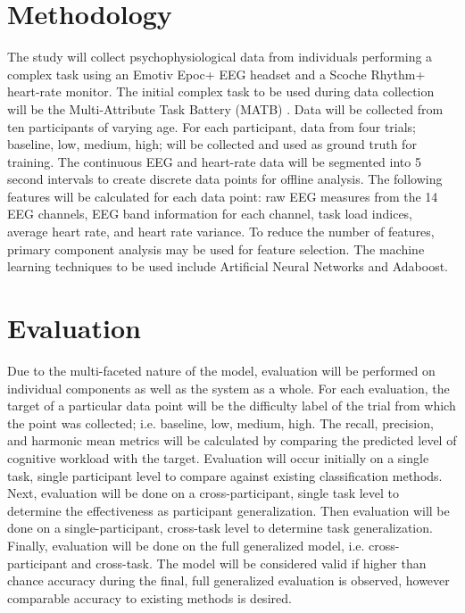 \documentclass[11pt]{artikel3}
\begin{document}
\section{Methodology}

The study will collect psychophysiological data from individuals performing a complex task using an Emotiv Epoc+ EEG headset and a Scoche Rhythm+ heart-rate monitor. The initial complex task to be used during data collection will be the Multi-Attribute Task Battery (MATB) \cite{miller_updated_2014}. Data will be collected from ten participants of varying age. For each participant, data from four trials; baseline, low, medium, high; will be collected and used as ground truth for training. The continuous EEG and heart-rate data will be segmented into 5 second intervals to create discrete data points for offline analysis. The following features will be calculated for each data point: raw EEG measures from the 14 EEG channels, EEG band information for each channel, task load indices, average heart rate, and heart rate variance. To reduce the number of features, primary component analysis may be used for feature selection. The machine learning techniques to be used include Artificial Neural Networks and Adaboost.

\section{Evaluation}

Due to the multi-faceted nature of the model, evaluation will be performed on individual components as well as the system as a whole. For each evaluation, the target of a particular data point will be the difficulty label of the trial from which the point was collected; i.e. baseline, low, medium, high. The recall, precision, and harmonic mean metrics will be calculated by comparing the predicted level of cognitive workload with the target. Evaluation will occur initially on a single task, single participant level to compare against existing classification methods. Next, evaluation will be done on a cross-participant, single task level to determine the effectiveness as participant generalization. Then evaluation will be done on a single-participant, cross-task level to determine task generalization. Finally, evaluation will be done on the full generalized model, i.e. cross-participant and cross-task. The model will be considered valid if higher than chance accuracy during the final, full generalized evaluation is observed, however comparable accuracy to existing methods is desired.



\end{document}
